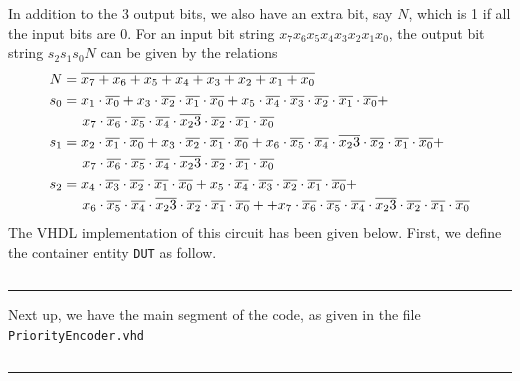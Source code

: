 \documentclass[a4paper, 11pt]{article}
\begin{document}
In addition to the 3 output bits, we also have an extra bit, say $N$, which is 1 if all the input bits are 0. For an input bit string $x_7x_6x_5x_4x_3x_2x_1x_0$, the output bit string $s_2s_1s_0N$ can be given by the relations
\begin{equation}
\begin{split}
N &= \overline{x_7+x_6+x_5+x_4+x_3+x_2+x_1+x_0} \\
s_0 &= x_1\cdot\overline{x_0} + x_3\cdot\overline{x_2}\cdot\overline{x_1}\cdot\overline{x_0} + x_5\cdot\overline{x_4}\cdot\overline{x_3}\cdot\overline{x_2}
\cdot\overline{x_1}\cdot\overline{x_0} + \\
& \hspace*{5mm} x_7\cdot\overline{x_6}\cdot\overline{x_5}\cdot\overline{x_4}\cdot\overline{x_23}\cdot\overline{x_2}\cdot\overline{x_1}\cdot\overline{x_0}\\
s_1 &= x_2\cdot\overline{x_1}\cdot\overline{x_0} + 
x_3\cdot\overline{x_2}\cdot\overline{x_1}\cdot\overline{x_0} +
x_6\cdot\overline{x_5}\cdot\overline{x_4}\cdot\overline{x_23}\cdot\overline{x_2}\cdot\overline{x_1}\cdot\overline{x_0}+
\\ &\hspace*{5mm} x_7\cdot\overline{x_6}\cdot\overline{x_5}\cdot\overline{x_4}\cdot\overline{x_23}\cdot\overline{x_2}\cdot\overline{x_1}\cdot\overline{x_0}\\
s_2 &= x_4\cdot\overline{x_3}\cdot\overline{x_2}\cdot\overline{x_1}\cdot\overline{x_0}
+ x_5\cdot\overline{x_4}\cdot\overline{x_3}\cdot\overline{x_2}
\cdot\overline{x_1}\cdot\overline{x_0} + \\
& \hspace*{5mm} x_6\cdot\overline{x_5}\cdot\overline{x_4}\cdot\overline{x_23}\cdot\overline{x_2}\cdot\overline{x_1}\cdot\overline{x_0}+
+ x_7\cdot\overline{x_6}\cdot\overline{x_5}\cdot\overline{x_4}\cdot\overline{x_23}\cdot\overline{x_2}\cdot\overline{x_1}\cdot\overline{x_0}
\end{split}
\end{equation}
\vspace*{1cm}
The VHDL implementation of this circuit has been given below. First, we define the container entity \texttt{DUT} as follow.

\inputminted[linenos]{vhdl}{Submission/PriorityEncoder/DUT.vhd}
\hrule
\vspace*{2mm}
Next up, we have the main segment of the code, as given in the file \texttt{PriorityEncoder.vhd}

\inputminted[linenos]{vhdl}{Submission/PriorityEncoder/PriorityEncoder.vhd}
\hrule
\vspace*{2mm}
\end{document}

